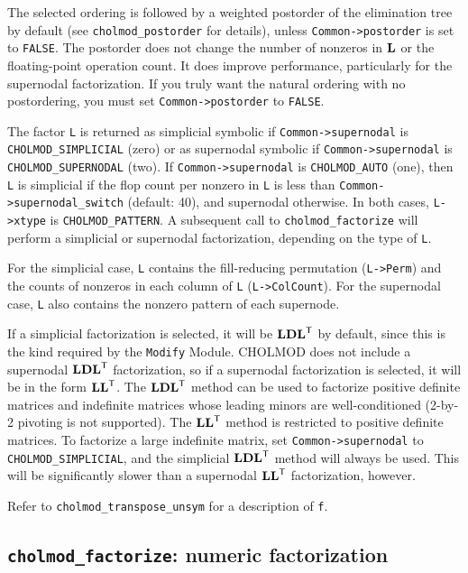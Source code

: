 \documentclass[11pt]{article}
\newcommand{\m}[1]{{\bf{#1}}}       %
\newcommand{\tr}{^{\sf T}}          %
\begin{document}
The selected ordering is followed by a weighted postorder of the elimination
tree by default (see {\tt cholmod\_postorder} for details),
unless {\tt Common->postorder} is set to {\tt FALSE}.
The postorder does not change the number of nonzeros in $\m{L}$ or
the floating-point operation count.  It does improve performance,
particularly for the supernodal factorization.
If you truly want the natural ordering with no postordering,
you must set {\tt Common->postorder} to {\tt FALSE}.

The factor {\tt L} is returned as simplicial symbolic if
{\tt Common->supernodal} is {\tt CHOLMOD\_SIMPLICIAL} (zero) or as supernodal symbolic if
{\tt Common->supernodal} is {\tt CHOLMOD\_SUPERNODAL} (two).  If \newline
{\tt Common->supernodal} is {\tt CHOLMOD\_AUTO} (one),
then {\tt L} is simplicial if the flop count per nonzero in {\tt L} is less than
{\tt Common->supernodal\_switch} (default: 40), and
supernodal otherwise.  In both cases, {\tt L->xtype} is {\tt CHOLMOD\_PATTERN}.
A subsequent call to {\tt cholmod\_factorize} will perform a
simplicial or supernodal factorization, depending on the type of {\tt L}.

For the simplicial case, {\tt L} contains the fill-reducing permutation ({\tt L->Perm})
and the counts of nonzeros in each column of {\tt L} ({\tt L->ColCount}).  For the
supernodal case, {\tt L} also contains the nonzero pattern of each supernode.

If a simplicial factorization is selected, it will be $\m{LDL}\tr$ by default, since
this is the kind required by the {\tt Modify} Module.  CHOLMOD does not include a
supernodal $\m{LDL}\tr$ factorization, so if a supernodal factorization is selected,
it will be in the form $\m{LL}\tr$.  The $\m{LDL}\tr$ method can be used to
factorize positive definite matrices and indefinite matrices whose leading minors
are well-conditioned (2-by-2 pivoting is not supported).  The $\m{LL}\tr$ method
is restricted to positive definite matrices.  To factorize a large indefinite matrix,
set {\tt Common->supernodal} to {\tt CHOLMOD\_SIMPLICIAL}, and the simplicial 
$\m{LDL}\tr$ method will always be used.  This will be significantly slower than
a supernodal $\m{LL}\tr$ factorization, however.

Refer to {\tt cholmod\_transpose\_unsym} for a description of {\tt f}.

\subsection{{\tt cholmod\_factorize}: numeric factorization}
\end{document}
